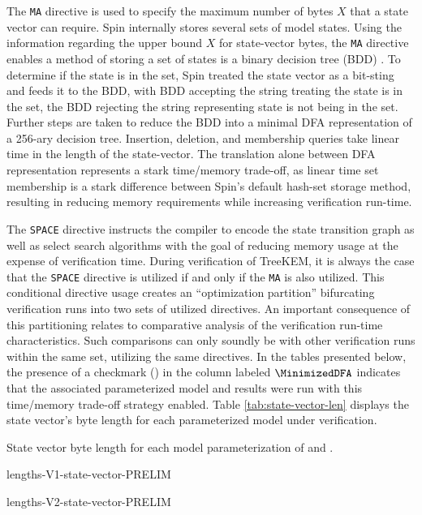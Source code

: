 The \texttt{MA} directive is used to specify the maximum number of bytes \(X\) that a state vector can require.
Spin internally stores several sets of model states.
Using the information regarding the upper bound \(X\) for state-vector bytes, the \texttt{MA} directive enables a method of storing a set of states is a binary decision tree (BDD) \autocite{holzmann1999minimized}.
To determine if the state is in the set, Spin treated the state vector as a bit-sting and feeds it to the BDD, with BDD accepting the string treating the state is in the set, the BDD rejecting the string representing state is not being in the set.
Further steps are taken to reduce the BDD into a minimal DFA representation of a 256-ary decision tree.
Insertion, deletion, and membership queries take linear time in the length of the state-vector.
The translation alone between DFA representation represents a stark time/memory trade-off, as linear time set membership is a stark difference between Spin's default hash-set storage method, resulting in reducing memory requirements while increasing verification run-time.

The \texttt{SPACE} directive instructs the compiler to encode the state transition graph as well as select search algorithms with the goal of reducing memory usage at the expense of verification time.
During verification of TreeKEM, it is always the case that the \texttt{SPACE} directive is utilized if and only if the \texttt{MA} is also utilized.
This conditional directive usage creates an ``optimization partition'' bifurcating verification runs into two sets of utilized directives.
An important consequence of this partitioning relates to comparative analysis of the verification run-time characteristics.
Such comparisons can only soundly be with other verification runs within the same set, utilizing the same directives.
In the tables presented below, the presence of a checkmark (\cmark) in the column labeled $\MinimizedDFA$ indicates that the associated parameterized model and results were run with this time/memory trade-off strategy enabled.
Table \ref{tab:state-vector-len} displays the state vector's byte length for each \CGKAmod{\VersionOne}{}{} parameterized model under verification.

\begin{table}[h!]
\caption{\label{tab:state-vector-len}State vector byte length for each model parameterization of \CGKAmod{\VersionOne}{}{} and \CGKAmod{\VersionTwo}{}{}.}
\hfill
\begin{minipage}{0.45\textwidth}
  \centering
  {lengths-V1-state-vector-PRELIM}
\end{minipage}
\begin{minipage}{0.45\textwidth}
  \centering
  {lengths-V2-state-vector-PRELIM}
\end{minipage}
\hfill
\end{table}

